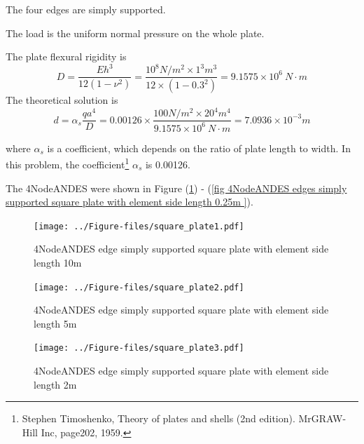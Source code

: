 \documentclass[fleqn,11pt]{article}
\begin{document}
The four edges are simply supported. 

The load is the uniform normal pressure on the whole plate. 

The plate flexural rigidity is 
\begin{equation}
  D=\frac{Eh^3}{12(1-\nu^2)}=\frac{10^8 N/m^2 \times 1^3 m^3 }{12 \times (1-0.3^2) }= 9.1575 \times 10^6 \ N\cdot m
\end{equation}
The theoretical solution is 
\begin{equation}
  d=\alpha_s \frac{q a^4}{D}=0.00126\times \frac{100 N/m^2 \times 20^4 m^4}{9.1575 \times 10^6 \ N\cdot m}=7.0936\times 10^{-3} m
\end{equation}

where $\alpha_s$ is a coefficient, which depends on the ratio of plate length to width. In this problem, the coefficient\footnote{Stephen Timoshenko, Theory of plates and shells (2nd edition). MrGRAW-Hill Inc, page202, 1959.} $\alpha_s$ is 0.00126.

The 4NodeANDES were shown in Figure (\ref{fig 4NodeANDES edges simply supported square plate with element side length 10m }) - (\ref{fig 4NodeANDES edges simply supported square plate with element side length 0.25m }). 



\begin{figure}[H]
  \centering
  \texttt{[image: ../Figure-files/square\_plate1.pdf]}
  \caption{4NodeANDES edge simply supported square plate with element side length 10m }
  \label{fig 4NodeANDES edges simply supported square plate with element side length 10m }
\end{figure}

\newpage

\begin{figure}[H]
  \centering
  \texttt{[image: ../Figure-files/square\_plate2.pdf]}
  \caption{4NodeANDES edge simply supported square plate with element side length 5m }
  \label{fig 4NodeANDES edges simply supported square plate with element side length 5m }
\end{figure}


\begin{figure}[H]
  \centering
  \texttt{[image: ../Figure-files/square\_plate3.pdf]}
  \caption{4NodeANDES edge simply supported square plate with element side length 2m }
  \label{fig 4NodeANDES edges simply supported square plate with element side length 2m }
\end{figure}

\newpage
\end{document}
